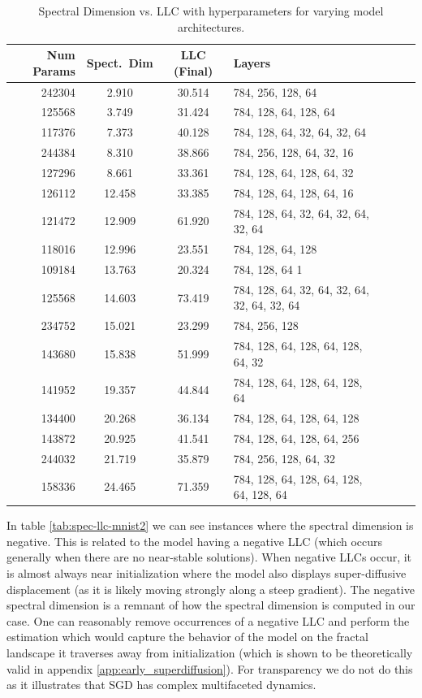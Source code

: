 \documentclass{article} %
\theoremstyle{definition}
\begin{document}
\begin{table}[ht]
    \caption{Spectral Dimension vs. LLC with hyperparameters for varying model architectures.}
  \centering
  \begin{tabular}{r c c l r r c}
    \toprule
    Num Params & Spect.~Dim & LLC (Final) & Layers \\
    \midrule
    242304 & 2.910 & 30.514 & 784, 256, 128, 64  \\
    125568 & 3.749 & 31.424 & 784, 128, 64, 128, 64  \\
    117376 & 7.373 & 40.128 & 784, 128, 64, 32, 64, 32, 64  \\
    244384 & 8.310 & 38.866 & 784, 256, 128, 64, 32, 16  \\
    127296 & 8.661 & 33.361 & 784, 128, 64, 128, 64, 32  \\
    126112 & 12.458 & 33.385 & 784, 128, 64, 128, 64, 16  \\
    121472 & 12.909 & 61.920 & 784, 128, 64, 32, 64, 32, 64, 32, 64 \\
    118016 & 12.996 & 23.551 & 784, 128, 64, 128  \\
    109184 & 13.763 & 20.324 & 784, 128, 64 1 \\
    125568 & 14.603 & 73.419 & 784, 128, 64, 32, 64, 32, 64, 32, 64, 32, 64 \\
    234752 & 15.021 & 23.299 & 784, 256, 128  \\
    143680 & 15.838 & 51.999 & 784, 128, 64, 128, 64, 128, 64, 32 \\
    141952 & 19.357 & 44.844 & 784, 128, 64, 128, 64, 128, 64  \\
    134400 & 20.268 & 36.134 & 784, 128, 64, 128, 64, 128 \\
    143872 & 20.925 & 41.541 & 784, 128, 64, 128, 64, 256  \\
    244032 & 21.719 & 35.879 & 784, 256, 128, 64, 32  \\
    158336 & 24.465 & 71.359 & 784, 128, 64, 128, 64, 128, 64, 128, 64 \\
    \bottomrule
  \end{tabular}
  \label{tab:spec-llc-mnist1}
\end{table}
In table \ref{tab:spec-llc-mnist2} we can see instances where the spectral dimension is negative. This is related to the model having a negative LLC (which occurs generally when there are no near-stable solutions). When negative LLCs occur, it is almost always near initialization where the model also displays super-diffusive displacement (as it is likely moving strongly along a steep gradient). The negative spectral dimension is a remnant of how the spectral dimension is computed in our case. One can reasonably remove occurrences of a negative LLC and perform the estimation which would capture the behavior of the model on the fractal landscape it traverses away from initialization (which is shown to be theoretically valid in appendix \ref{app:early_superdiffusion}). For transparency we do not do this as it illustrates that SGD has complex multifaceted dynamics. 
\end{document}

